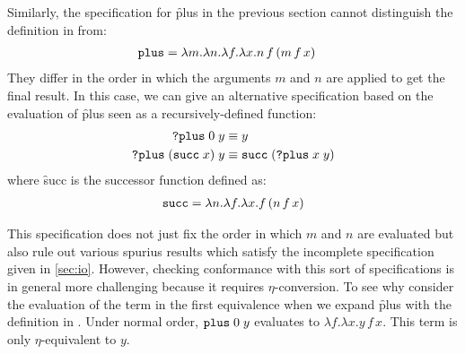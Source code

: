 Similarly, the specification for \f{plus} in the previous
section cannot distinguish the definition in
 from:
%
\begin{align}
  \label{eq:plus-def2}
  \texttt{plus} &= \lambda m.\lambda n.\lambda f.\lambda x.n\,f\,(m\,f\,x)
\end{align}
%
They differ in the order in which the arguments $m$ and $n$
are applied to get the final result.
%
In this case, we can give an alternative specification based
on the evaluation of \f{plus} seen as a recursively-defined
function:
%
\begin{align*}
  \texttt{?plus}\;0\;y &\equiv y \\
  \texttt{?plus}\;(\texttt{succ}\;x)\;y &\equiv \texttt{succ}\;(\texttt{?plus}\;x\;y)
\end{align*}
%
where \f{succ} is the successor function defined as:
%
\begin{align*}
  \texttt{succ} = \lambda n. \lambda f. \lambda x. f\,(n\,f\,x)
\end{align*}

This specification does not just fix the order in which $m$
and $n$ are evaluated but also rule out various spurius
results which satisfy the incomplete specification given in
\cref{sec:io}.
%
However, checking conformance with this sort of
specifications is in general more challenging because it
requires $\eta$-conversion.
%
To see why consider the evaluation of the term in the first
equivalence when we expand \f{plus} with the definition in
.
%
Under normal order, $\texttt{plus}\;0\;y$ evaluates to $\lambda
f.\lambda x. y\,f\,x$.
%
This term is only $\eta$-equivalent to $y$.


